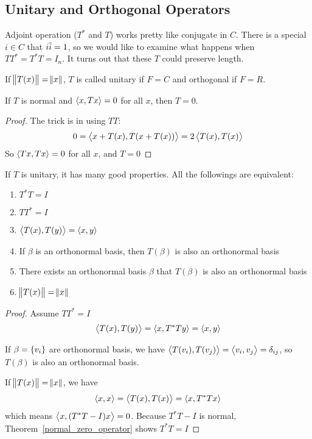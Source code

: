 \subsection{Unitary and Orthogonal Operators}

Adjoint operation ($T^*$ and $T$) works pretty like conjugate in $C$. There is a special $i \in C$  that $i \overline{i} = 1$, so we would like to examine what happens when $TT^* = T^* T = I_n$. It turns out that these $T$ could preserve length.

\begin{definition}\label{unitary}
    If $\norm{T(x)} = \norm{x}$, $T$ is called unitary if $F=C$ and orthogonal if $F=R$.
\end{definition}




\begin{theorem}\label{normal_zero_operator}
    If $T$ is normal and $\left\langle \displaystyle x, Tx \right\rangle = 0$ for all $x$, then $T=0$.
\end{theorem}
\begin{proof}
    The trick is in using $TT$:
    \begin{equation*}
        0 = \left\langle \displaystyle x + T(x), T(x + T(x)) \right\rangle = 2 \left\langle \displaystyle T(x), T(x) \right\rangle
    \end{equation*}
    So $\left\langle \displaystyle Tx, Tx \right\rangle = 0$ for all $x$, and $T = 0$
\end{proof}


If $T$ is unitary, it has many good properties. All the followings are equivalent:
\begin{enumerate}
    \item $T^*T = I$
    \item $TT^* = I$
    \item $\left\langle \displaystyle T(x), T(y) \right\rangle = \left\langle \displaystyle x, y \right\rangle$
    \item If $\beta$ is an orthonormal basis, then $T(\beta)$ is also an orthonormal basis
    \item There exists an orthonormal basis $\beta$ that $T(\beta)$ is also an orthonormal basis
    \item $\norm{T(x)} = \norm{x}$
\end{enumerate}
\begin{proof}
    Assume $TT^* = I$
    \begin{equation*}
        \left\langle \displaystyle T(x), T(y) \right\rangle = \left\langle \displaystyle x, T^*Ty \right\rangle = \left\langle \displaystyle x, y \right\rangle
    \end{equation*}
    
    If $\beta = \set{v_i}$ are orthonormal basis, we have $\left\langle \displaystyle T(v_i), T(v_j) \right\rangle = \left\langle \displaystyle v_i, v_j \right\rangle = \delta_{ij}$, so $T(\beta)$ is also an orthonormal basis.
    
    If $\norm{T(x)} = \norm{x}$, we have 
    \begin{equation*}
        \left\langle \displaystyle x, x \right\rangle = \left\langle \displaystyle T(x), T(x) \right\rangle = \left\langle \displaystyle x, T^*Tx \right\rangle
    \end{equation*}
    which means $\left\langle \displaystyle x, (T^*T - I)x \right\rangle = 0$. Because $T^*T - I$ is normal, Theorem~\ref{normal_zero_operator} shows $T^*T = I$
\end{proof}

